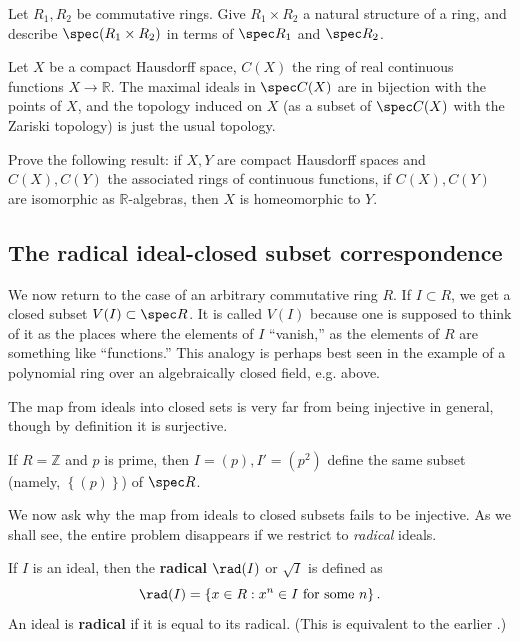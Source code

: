 \begin{exercise} 
Let $R_1, R_2$ be commutative rings. Give $R_1 \times R_2$ a
natural structure
of a ring, and describe $\spec( R_1 \times R_2)$ in terms of
$\spec R_1$ and
$\spec R_2$.
\end{exercise} 


\begin{exercise} 
Let $X$ be a compact Hausdorff space, $C(X)$ the ring of real
continuous
functions $X \to \mathbb{R}$. 
The maximal ideals in $\spec C(X)$ are in bijection with the
points of $X$,
and the topology induced on $X $ (as a subset of $\spec C(X)$ with the Zariski
topology)
is just the usual topology.
\end{exercise}

\begin{exercise}
Prove the following result: if $X, Y$ are compact Hausdorff
spaces and $C(X),
C(Y)$ the associated rings of continuous functions, if $C(X),
C(Y)$ are
isomorphic as $\mathbb{R}$-algebras, then $X$ is homeomorphic to
$Y$.
\end{exercise} 


\subsection{The radical ideal-closed subset correspondence}

We now return to the case of an arbitrary commutative ring $R$.
If $I \subset R$, we get a closed
subset $V(I) \subset \spec R$. It is called $V(I)$ because one
is supposed to
think of it as the places where the elements of $I$ ``vanish,''
as the
elements of $R$ are something like ``functions.'' This analogy
is perhaps best
seen in the example of a polynomial ring over an algebraically
closed field,
e.g.  above.

The map from ideals into closed sets is very far from being
injective in
general, though by definition it is surjective.

\begin{example} 
If $R = \mathbb{Z}$ and $p$ is prime, then $I = (p), I' = (p^2)$
define the
same subset (namely, $\left\{(p)\right\}$) of
$\spec R$. 
\end{example} 

We now ask why the map from ideals to closed
subsets fails to
be injective. As we shall see, the entire problem disappears if
we restrict to
\emph{radical} ideals.

\begin{definition} 
If $I$ is an ideal, then the \textbf{radical} $\rad(I) $ or $
\sqrt{I}$ is
defined as $$\rad(I) =
\left\{x \in R: x^n \in I \ \mathrm{for} \ \mathrm{some} \ n
\right\}.$$
An ideal is \textbf{radical} if it is equal to its radical.
(This is
equivalent to the earlier .) 
\end{definition} 

